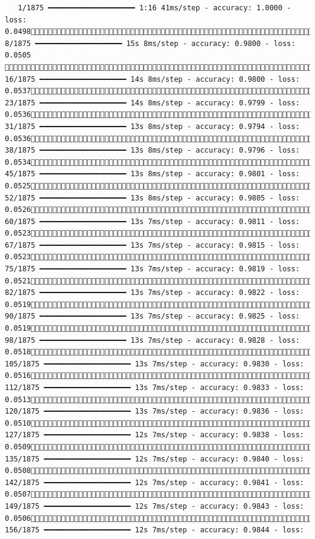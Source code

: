 \documentclass[
  letterpaper,
  DIV=11,
  numbers=noendperiod]{scrreprt}
\begin{document}
\begin{verbatim}
   1/1875 ━━━━━━━━━━━━━━━━━━━━ 1:16 41ms/step - accuracy: 1.0000 - loss: 0.0498   8/1875 ━━━━━━━━━━━━━━━━━━━━ 15s 8ms/step - accuracy: 0.9800 - loss: 0.0505    16/1875 ━━━━━━━━━━━━━━━━━━━━ 14s 8ms/step - accuracy: 0.9800 - loss: 0.0537  23/1875 ━━━━━━━━━━━━━━━━━━━━ 14s 8ms/step - accuracy: 0.9799 - loss: 0.0536  31/1875 ━━━━━━━━━━━━━━━━━━━━ 13s 8ms/step - accuracy: 0.9794 - loss: 0.0536  38/1875 ━━━━━━━━━━━━━━━━━━━━ 13s 8ms/step - accuracy: 0.9796 - loss: 0.0534  45/1875 ━━━━━━━━━━━━━━━━━━━━ 13s 8ms/step - accuracy: 0.9801 - loss: 0.0525  52/1875 ━━━━━━━━━━━━━━━━━━━━ 13s 8ms/step - accuracy: 0.9805 - loss: 0.0526  60/1875 ━━━━━━━━━━━━━━━━━━━━ 13s 7ms/step - accuracy: 0.9811 - loss: 0.0523  67/1875 ━━━━━━━━━━━━━━━━━━━━ 13s 7ms/step - accuracy: 0.9815 - loss: 0.0523  75/1875 ━━━━━━━━━━━━━━━━━━━━ 13s 7ms/step - accuracy: 0.9819 - loss: 0.0521  82/1875 ━━━━━━━━━━━━━━━━━━━━ 13s 7ms/step - accuracy: 0.9822 - loss: 0.0519  90/1875 ━━━━━━━━━━━━━━━━━━━━ 13s 7ms/step - accuracy: 0.9825 - loss: 0.0519  98/1875 ━━━━━━━━━━━━━━━━━━━━ 13s 7ms/step - accuracy: 0.9828 - loss: 0.0518 105/1875 ━━━━━━━━━━━━━━━━━━━━ 13s 7ms/step - accuracy: 0.9830 - loss: 0.0516 112/1875 ━━━━━━━━━━━━━━━━━━━━ 13s 7ms/step - accuracy: 0.9833 - loss: 0.0513 120/1875 ━━━━━━━━━━━━━━━━━━━━ 13s 7ms/step - accuracy: 0.9836 - loss: 0.0510 127/1875 ━━━━━━━━━━━━━━━━━━━━ 12s 7ms/step - accuracy: 0.9838 - loss: 0.0509 135/1875 ━━━━━━━━━━━━━━━━━━━━ 12s 7ms/step - accuracy: 0.9840 - loss: 0.0508 142/1875 ━━━━━━━━━━━━━━━━━━━━ 12s 7ms/step - accuracy: 0.9841 - loss: 0.0507 149/1875 ━━━━━━━━━━━━━━━━━━━━ 12s 7ms/step - accuracy: 0.9843 - loss: 0.0506 156/1875 ━━━━━━━━━━━━━━━━━━━━ 12s 7ms/step - accuracy: 0.9844 - loss: 
\end{verbatim}
\end{document}
